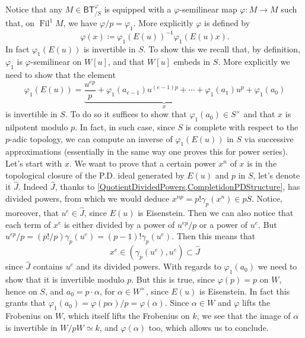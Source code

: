 \begin{rem}[]\label{invertibilityphi1E(u))}
	Notice that any $M \in \mathsf{BT}^{\varphi}_{/S}$ is equipped with a 
	$\varphi$-semilinear map $\varphi\colon M \to M$ 
	such that, on \(\operatorname{Fil}^1 M\), we have
	\(\varphi / p = \varphi_1\).
	More explicitly \(\varphi\) is defined by
	\begin{equation*}
		\varphi (x) \coloneqq \varphi_1 \left( E(u) \right)^{-1} \varphi_1 (E(u)x)
	.\end{equation*}
	In fact $\varphi_1(E(u))$ is invertible in $S$.
	To show this we recall that, by definition, $\varphi_1$ is
	$\varphi$-semilinear on $W[u]$, and that $W[u]$ embeds in $S$.
	More explicitly we need to show that the element
	\begin{equation*}
		\varphi_1(E(u)) =
		\underbrace{\frac{ u^{ep} }{ p } + \varphi_1(a_{e-1}) u^{(e-1)p} +
		\cdots + \varphi_1(a_1)u^p}_{x} + \varphi_1(a_0)
	\end{equation*}
	is invertible in $S$.
	To do so it suffices to show that $\varphi_1(a_0) \in S^{\times}$ and
	that $x$ is nilpotent modulo $p$. 
	In fact, in such case, since $S$ is complete with respect to the
	$p$-adic topology, we can compute an inverse of $\varphi_1(E(u))$
	in $S$ via successive approximations (essentially in the same
	way one proves this for power series).
	Let's start with $x$.
	We want to prove that a certain power $x^n$ of $x$
	is in the topological closure of the P.D. ideal generated by 
	\(E(u)\) and \(p\) in \(S\), let's denote it \(\widehat{J}\).
	Indeed \(\widehat{J}\), thanks to \cref{QuotientDividedPowers,CompletidonPDStructure},
	has divided powers, from which we would deduce $x^{np} = p! \gamma_p(x^n) \in pS$.
	Notice, moreover, that $u^e \in \widehat{J}$, since $E(u)$ is
	Eisenstein.
	Then we can also notice that each term of $x^e$ is either divided by
	a power of $u^{ep}/p$ or a power of $u^e$.
	But $u^{ep}/p = (p!/p) \gamma_p(u^e) = (p-1)! \gamma_p(u^e)$.
	Then this means that
	\begin{equation*}
		x^e \in \left( \gamma_p(u^e), u^e \right) \subset \widehat{J}
	\end{equation*}
	since $\widehat{J}$ contains $u^e$ and its divided powers.
	With regards to $\varphi_1(a_0)$ we need to show that it 
	is invertible modulo $p$.
	But this is true, since $\varphi(p) = p$ on $W$, hence on $S$,
	and $a_0 = p \cdot \alpha$, for $\alpha \in W^{\times}$, since \(E(u)\) is Eisenstein.
	In fact this grants that $\varphi_1(a_0) = \varphi(p \alpha)/p = \varphi(\alpha)$.
	Since $\alpha \in W$ and $\varphi$ lifts the Frobenius on $W$,
	which itself lifts the Frobenius on $k$, we see that the image
	of $\alpha$ is invertible in $W/pW \simeq k$, and $\varphi(\alpha)$ too,
	which allows us to conclude.
\end{rem}


